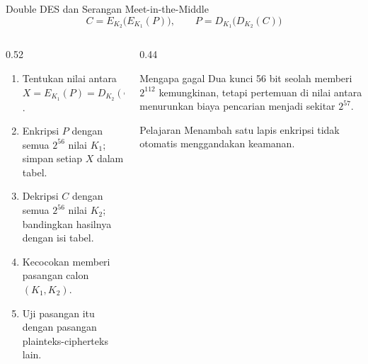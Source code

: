 \documentclass[aspectratio=169,11pt]{beamer}
\begin{document}
\begin{frame}{Double DES dan Serangan Meet-in-the-Middle}
    \footnotesize
    \[
        C=E_{K_2}\bigl(E_{K_1}(P)\bigr), \qquad
        P=D_{K_1}\bigl(D_{K_2}(C)\bigr)
    \]
    \begin{columns}[T,onlytextwidth]
        \begin{column}{0.52\textwidth}
            \begin{enumerate}
                \item Tentukan nilai antara
                      $X=E_{K_1}(P)=D_{K_2}(C)$.
                \item Enkripsi $P$ dengan semua $2^{56}$ nilai $K_1$;
                      simpan setiap $X$ dalam tabel.
                \item Dekripsi $C$ dengan semua $2^{56}$ nilai $K_2$;
                      bandingkan hasilnya dengan isi tabel.
                \item Kecocokan memberi pasangan calon $(K_1,K_2)$.
                \item Uji pasangan itu dengan pasangan
                      plainteks-cipherteks lain.
            \end{enumerate}
        \end{column}
        \begin{column}{0.44\textwidth}
            \begin{alertblock}{Mengapa gagal}
                \footnotesize
                Dua kunci 56 bit seolah memberi $2^{112}$ kemungkinan,
                tetapi pertemuan di nilai antara menurunkan biaya
                pencarian menjadi sekitar $2^{57}$.
            \end{alertblock}
            \begin{block}{Pelajaran}
                \footnotesize
                Menambah satu lapis enkripsi tidak otomatis menggandakan
                keamanan.
            \end{block}
        \end{column}
    \end{columns}
\end{frame}
\end{document}
